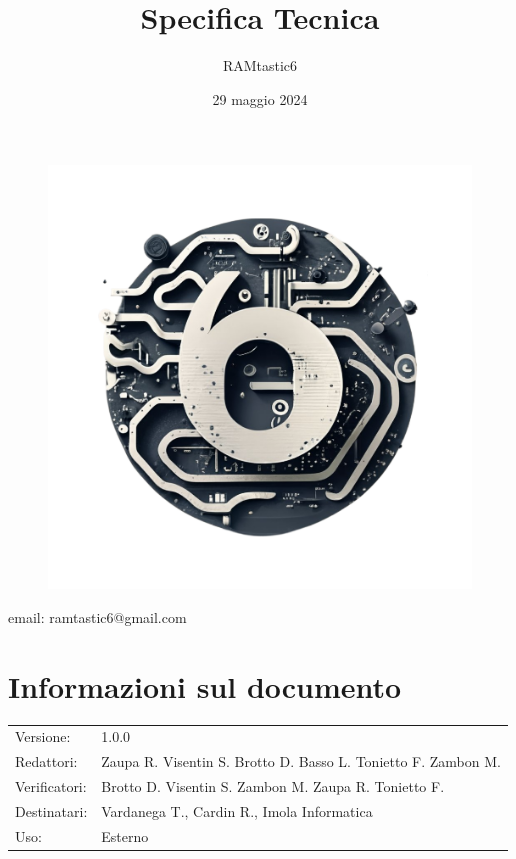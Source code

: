 \documentclass[12pt, oneside]{article}
\author{RAMtastic6}
\begin{document}
\thispagestyle{empty}
\title{Specifica Tecnica}
\date{29 maggio 2024}
\maketitle
\begin{figure}[h]
  \centering
  \includegraphics[scale=0.3]{logo.png}
\end{figure}
\begin{center}
    email: ramtastic6@gmail.com
\end{center}

\section*{Informazioni sul documento} 
\begin{tabular}{ll}
Versione: & 1.0.0 \\
Redattori: &  Zaupa R. Visentin S. Brotto D. Basso L. Tonietto F. Zambon M. \\
Verificatori: & Brotto D. Visentin S. Zambon M. Zaupa R. Tonietto F. \\
Destinatari: & Vardanega T., Cardin R., Imola Informatica \\
Uso: & Esterno
\end{tabular}
\newpage
\end{document}

